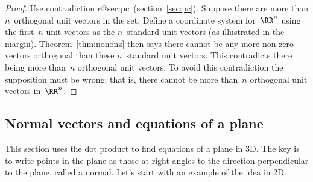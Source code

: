 \begin{proof} 
Use contradiction%
\ifcsname r@sec:pc\endcsname\ (section~\ref{sec:pc})\fi.
Suppose there are more than \(n\)~orthogonal unit vectors in the set.
Define a coordinate system for~\(\RR^n\) using the first~\(n\) unit vectors as the \(n\)~standard unit vectors (as illustrated in the margin). 
Theorem~\ref{thm:nononz} then says there cannot be any more non-zero vectors orthogonal than these \(n\)~standard unit vectors.
This contradicts there being more than~\(n\) orthogonal unit vectors.
%
To avoid this contradiction the supposition must be wrong; that is, there cannot be more than~\(n\) orthogonal unit vectors in~\(\RR^n\).
\end{proof}








\subsection{Normal vectors and equations of a plane}
\label{sec:nvep}

This section uses the dot product to find equations of a plane in 3D.
The key is to write points in the plane as those at right-angles to the direction perpendicular to the plane, called a normal.
Let's start with an example of the idea in 2D.

